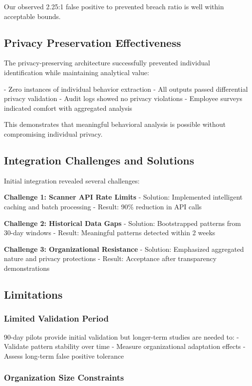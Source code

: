 \documentclass[11pt,a4paper]{article}
\begin{document}
Our observed 2.25:1 false positive to prevented breach ratio is well within acceptable bounds.

\subsection{Privacy Preservation Effectiveness}

The privacy-preserving architecture successfully prevented individual identification while maintaining analytical value:

- Zero instances of individual behavior extraction
- All outputs passed differential privacy validation
- Audit logs showed no privacy violations
- Employee surveys indicated comfort with aggregated analysis

This demonstrates that meaningful behavioral analysis is possible without compromising individual privacy.

\subsection{Integration Challenges and Solutions}

Initial integration revealed several challenges:

\textbf{Challenge 1: Scanner API Rate Limits}
- Solution: Implemented intelligent caching and batch processing
- Result: 90\% reduction in API calls

\textbf{Challenge 2: Historical Data Gaps}
- Solution: Bootstrapped patterns from 30-day windows
- Result: Meaningful patterns detected within 2 weeks

\textbf{Challenge 3: Organizational Resistance}
- Solution: Emphasized aggregated nature and privacy protections
- Result: Acceptance after transparency demonstrations

\subsection{Limitations}

\subsubsection{Limited Validation Period}

90-day pilots provide initial validation but longer-term studies are needed to:
- Validate pattern stability over time
- Measure organizational adaptation effects
- Assess long-term false positive tolerance

\subsubsection{Organization Size Constraints}
\end{document}
